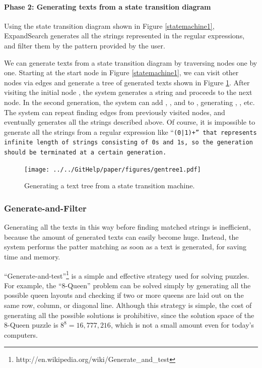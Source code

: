 \documentclass[manuscript,anonymous,review]{acmart}
\def\ES{\textsf{ExpandSearch}}
\begin{document}
\paragraph{Phase 2: Generating texts from a state transition diagram}

Using the state transition diagram shown in Figure \ref{statemachine1},
{\ES} generates all the strings represented in the regular expressions,
and filter them by the pattern provided by the user.

We can generate texts from a state transition diagram by traversing nodes one by one.
Starting at the start node
in Figure \ref{statemachine1},
we can visit other nodes via edges and generate a tree of generated texts
shown in Figure \ref{gentree1}.
After visiting the initial node
,
the system generates a string  and proceeds to the next node.
In the second generation,
the system can add , , and 
to , generating
, , etc.
The system can repeat finding edges from previously visited nodes,
and eventually generates all the strings described above.
Of course, it is impossible to generate all the strings
from a regular expression like ``\tt{(0|1)+}'' that represents infinite length of
strings consisting of \tt{0}s and \tt{1}s, so the generation should be
terminated at a certain generation.

\begin{figure}[htb]
\texttt{[image: ../../GitHelp/paper/figures/gentree1.pdf]}
\caption{Generating a text tree from a state transition machine.}
\label{gentree1}
\end{figure}

\subsubsection{Generate-and-Filter}

Generating all the texts in this way before finding matched strings is
inefficient, because the amount of generated texts can easily become huge.
Instead, the system performs the patter matching as soon as a text is generated,
for saving time and memory.

``Generate-and-test''\footnote{
  {\sf http:{\slash}{\slash}en.wikipedia.org{\slash}wiki{\slash}Generate\_and\_test}
}
is a simple and effective strategy used for solving puzzles.
For example,
the ``8-Queen'' problem can be solved simply by
generating all the possible queen layouts and checking if
two or more queens are laid out on the same row, column, or diagonal line.
Although this strategy is simple, the cost of
generating all the possible solutions is prohibitive, since
the solution space of the 8-Queen puzzle is $8^8 = 16,777,216$,
which is not a small amount even for today's computers.
\end{document}
